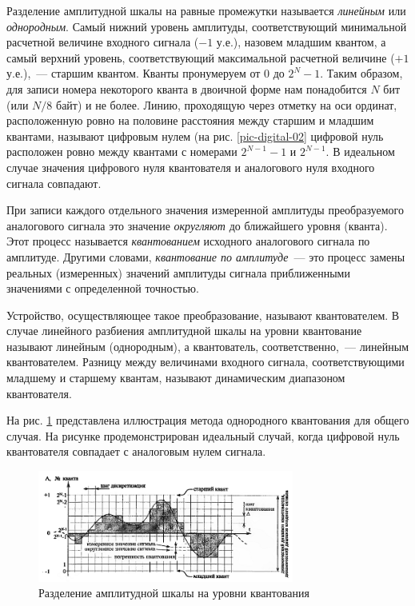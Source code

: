 \documentclass[oneside, final, 14pt]{extreport}
\begin{document}
Разделение амплитудной шкалы на равные промежутки называется \textit{линейным} или \textit{однородным}. Самый нижний уровень амплитуды, соответствующий минимальной расчетной величине входного сигнала ($-1$ у.е.), назовем младшим квантом, а самый верхний уровень, соответствующий максимальной расчетной величине ($+1$ у.е.),~--- старшим квантом. Кванты пронумеруем от $0$ до $2^N-1$. Таким образом, для записи номера некоторого кванта в двоичной форме нам понадобится $N$ бит (или $N/8$ байт) и не более. Линию, проходящую через отметку на оси ординат, расположенную ровно на половине расстояния между старшим и младшим квантами,
называют цифровым нулем (на рис. \ref{pic-digital-02} цифровой нуль расположен ровно между квантами с номерами $2^{N-1}-1$ и $2^{N-1}$. В идеальном случае значения цифрового нуля квантователя и аналогового нуля входного сигнала совпадают.

При записи каждого отдельного значения измеренной амплитуды преобразуемого аналогового сигнала это значение \textit{округляют} до ближайшего уровня (кванта). Этот процесс называется \textit{квантованием} исходного аналогового сигнала по амплитуде. Другими словами, \textit{квантование по амплитуде}~--- это процесс замены реальных (измеренных) значений амплитуды сигнала приближенными значениями с определенной точностью. 

Устройство, осуществляющее такое преобразование, называют квантователем. В случае линейного разбиения амплитудной шкалы на уровни квантование называют линейным (однородным), а квантователь, соответственно,~--- линейным квантователем. Разницу между величинами входного сигнала, соответствующими младшему и старшему квантам, называют динамическим диапазоном квантователя. 

На рис. \ref{pic-digital-03} представлена иллюстрация метода однородного квантования для общего случая. На рисунке продемонстрирован идеальный случай, когда цифровой нуль квантователя совпадает с аналоговым нулем сигнала.

\begin{figure}[h]
\centering
\includegraphics[width=0.75\textwidth]{pic-digital-03}
\caption{Разделение амплитудной шкалы на уровни квантования}
\label{pic-digital-03}
\end{figure}
\end{document}
